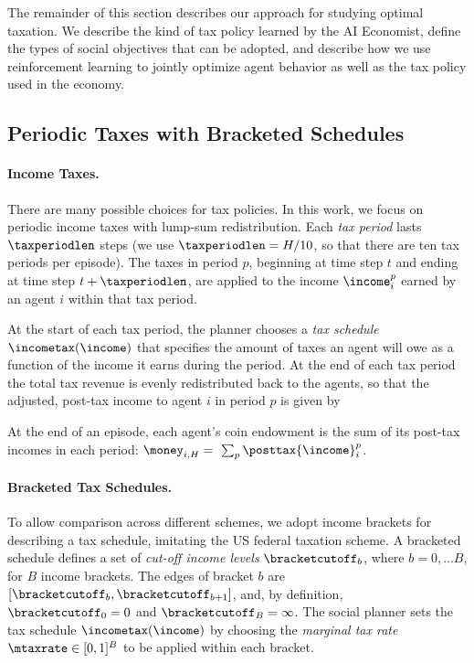 The remainder of this section describes our approach for studying optimal taxation.
We describe the kind of tax policy learned by the AI Economist, define the types of social objectives that can be adopted, and describe how we use reinforcement learning to jointly optimize agent behavior as well as the tax policy used in the economy.


\subsection{Periodic Taxes with Bracketed Schedules}
\label{sect:brackettax}

\paragraph{Income Taxes.}
There are many possible choices for tax policies.
In this work, we focus on periodic income taxes with lump-sum redistribution.
Each {\em tax period} lasts $\taxperiodlen$ steps (we use $\taxperiodlen=H/10$, so that there are ten tax periods per episode).
The taxes in period $p$, beginning at time step $t$ and ending at time step $t+\taxperiodlen$, are applied to the income $\income^p_i$ earned by an agent $i$ within that tax period.

At the start of each tax period, the planner chooses a {\em tax schedule} $\incometax(\income)$ that specifies the amount of taxes an agent will owe as a function of the income it earns during the period.
At the end of each tax period the total tax revenue is evenly redistributed back to the agents, so that the adjusted, post-tax income to agent $i$ in period $p$ is given by

At the end of an episode, each agent's coin endowment is the sum of its post-tax incomes in each period:
$\money_{i,H} = \ \sum_p \posttax{\income}^p_i$.

\paragraph{Bracketed Tax Schedules.}
To allow comparison across different schemes, we adopt income brackets for describing a tax schedule, imitating the US federal taxation scheme.
A bracketed schedule defines a set of {\em cut-off income levels} $\bracketcutoff_b$, where $b = 0, \ldots B$, for $B$ income brackets.
The edges of bracket $b$ are $[\bracketcutoff_b, \bracketcutoff_{b+1}]$, and, by definition, $\bracketcutoff_0 = 0$ and $\bracketcutoff_B = \infty$.
The social planner sets the tax schedule $\incometax(\income)$ by choosing the \textit{marginal tax rate} $\mtaxrate \in [0, 1]^B$ to be applied within each bracket.

